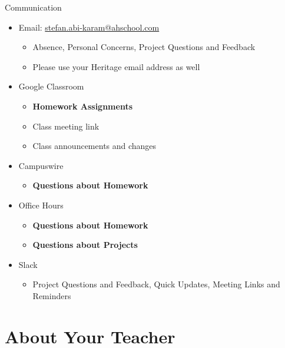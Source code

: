 \documentclass[aspectratio=169]{beamer}
\begin{document}
\begin{frame}{Communication}

    \begin{itemize}
        \item Email: \href{mailto:stefan.abi-karam@ahschool.com}{stefan.abi-karam@ahschool.com}
              \begin{itemize}
                  \item Absence, Personal Concerns, Project Questions and Feedback
                  \item Please use your Heritage email address as well
              \end{itemize}

        \item Google Classroom
              \begin{itemize}
                  \item \textbf{Homework Assignments}
                  \item Class meeting link
                  \item Class announcements and changes
              \end{itemize}

        \item Campuswire
              \begin{itemize}
                  \item \textbf{Questions about Homework}
              \end{itemize}

        \item Office Hours
              \begin{itemize}
                  \item \textbf{Questions about Homework}
                  \item \textbf{Questions about Projects}
              \end{itemize}

        \item Slack
              \begin{itemize}
                  \item Project Questions and Feedback, Quick Updates, Meeting Links and Reminders
              \end{itemize}
    \end{itemize}

\end{frame}

\section{About Your Teacher}
\end{document}
